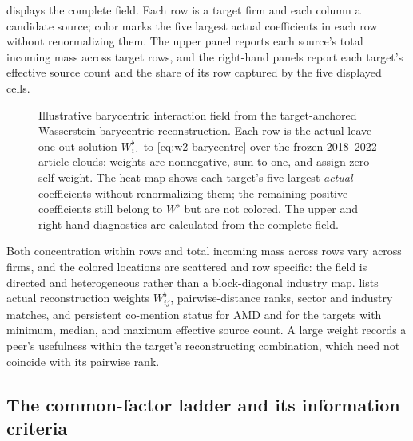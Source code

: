  displays the complete field.
Each row is a target firm and each column a candidate source; color marks the
five largest actual coefficients in each row without renormalizing them.
The upper panel reports each source's total incoming mass across target rows,
and the right-hand panels report each target's effective source count and the
share of its row captured by the five displayed cells.

\begin{figure}[htbp]
  \centering
  \caption{Illustrative barycentric interaction field from the target-anchored
    Wasserstein barycentric reconstruction. Each row is the actual
    leave-one-out solution $W^\flat_{i\cdot}$ to \eqref{eq:w2-barycentre} over
    the frozen 2018--2022 article clouds: weights are nonnegative, sum to one,
    and assign zero self-weight. The heat map shows each target's five largest
    \emph{actual} coefficients without renormalizing them; the remaining
    positive coefficients still belong to $W^\flat$ but are not colored. The
  upper and right-hand diagnostics are calculated from the complete field.}
  \label{fig:wflat-barycentric-mixtures}
\end{figure}

Both concentration within rows and total incoming mass across rows vary across
firms, and the colored locations are scattered and row specific: the field is
directed and heterogeneous rather than a block-diagonal industry map.
 lists actual reconstruction weights $W^\flat_{ij}$,
pairwise-distance ranks, sector and industry matches, and persistent
co-mention status for AMD and for the targets with minimum, median, and maximum
effective source count.
A large weight records a peer's usefulness within the target's reconstructing
combination, which need not coincide with its pairwise rank.



\subsection{The common-factor ladder and its information criteria}
\label{sec:app-information-criteria}

